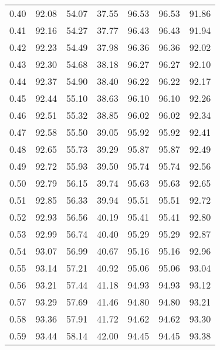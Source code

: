 \begin{tabular}{|c|c|c|c|c|c|c|}
      0.40 &     92.08 &     54.07 &      37.55 &   96.53 &      96.53 &         91.86 \\
      0.41 &     92.16 &     54.27 &      37.77 &   96.43 &      96.43 &         91.94 \\
      0.42 &     92.23 &     54.49 &      37.98 &   96.36 &      96.36 &         92.02 \\
      0.43 &     92.30 &     54.68 &      38.18 &   96.27 &      96.27 &         92.10 \\
      0.44 &     92.37 &     54.90 &      38.40 &   96.22 &      96.22 &         92.17 \\
      0.45 &     92.44 &     55.10 &      38.63 &   96.10 &      96.10 &         92.26 \\
      0.46 &     92.51 &     55.32 &      38.85 &   96.02 &      96.02 &         92.34 \\
      0.47 &     92.58 &     55.50 &      39.05 &   95.92 &      95.92 &         92.41 \\
      0.48 &     92.65 &     55.73 &      39.29 &   95.87 &      95.87 &         92.49 \\
      0.49 &     92.72 &     55.93 &      39.50 &   95.74 &      95.74 &         92.56 \\
      0.50 &     92.79 &     56.15 &      39.74 &   95.63 &      95.63 &         92.65 \\
      0.51 &     92.85 &     56.33 &      39.94 &   95.51 &      95.51 &         92.72 \\
      0.52 &     92.93 &     56.56 &      40.19 &   95.41 &      95.41 &         92.80 \\
      0.53 &     92.99 &     56.74 &      40.40 &   95.29 &      95.29 &         92.87 \\
      0.54 &     93.07 &     56.99 &      40.67 &   95.16 &      95.16 &         92.96 \\
      0.55 &     93.14 &     57.21 &      40.92 &   95.06 &      95.06 &         93.04 \\
      0.56 &     93.21 &     57.44 &      41.18 &   94.93 &      94.93 &         93.12 \\
      0.57 &     93.29 &     57.69 &      41.46 &   94.80 &      94.80 &         93.21 \\
      0.58 &     93.36 &     57.91 &      41.72 &   94.62 &      94.62 &         93.30 \\
      0.59 &     93.44 &     58.14 &      42.00 &   94.45 &      94.45 &         93.38 \\

\end{tabular}
